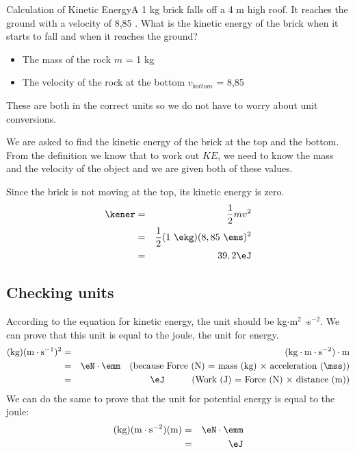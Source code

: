 \begin{wex}{Calculation of Kinetic Energy}{A 1 kg brick falls off a 4 m high roof. It reaches the ground with a velocity of 8,85 \ms. What is the kinetic energy of the brick when it starts to fall and when it reaches the ground?}
{
\begin{itemize}
\item The mass of the rock $m$ = 1 kg
\item The velocity of the rock at the bottom $v_{bottom}$ = 8,85 \ms
\end{itemize}
These are both in the correct units so we do not have to worry about unit
conversions.

We are asked to find the kinetic energy of the brick at the top and the bottom. From the definition we know that to work out $KE$, we need to know the mass and the velocity of the object and we are given both of these values.

Since the brick is not moving at the top, its kinetic energy is zero.
\begin{eqnarray*}
\kener & = & \frac{1}{2}mv^2 \\
&=& \frac{1}{2}(1\ \ekg)(8,85\ \ems)^2 \\
&=& 39,2\eJ
\end{eqnarray*}}
\end{wex}

\subsection{Checking units}
According to the equation for kinetic energy, the unit should be kg$\cdot$m$^2$ $\cdot$s$^{-2}$. We can prove that this unit is equal to the joule, the unit for energy.
\begin{eqnarray*}
\mathrm{(kg)(m \cdot s^{-1})^2}&=& \mathrm{(kg\cdot m \cdot s^{-2})\cdot m}\\
&=& \eN \cdot \emm\ \ \ (\mbox{because Force (N) = mass (kg) $\times$ acceleration (\mss)})\\
&=& \eJ \ \ \ \ \ \ \ \ \ (\mbox{Work (J) = Force (N) $\times$ distance (m)})
\end{eqnarray*}
We can do the same to prove that the unit for potential energy is equal to the joule:
\begin{eqnarray*}
\mathrm{(kg)(m \cdot s^{-2})(m)}&=& \eN \cdot \emm \\
&=& \eJ 
\end{eqnarray*}

